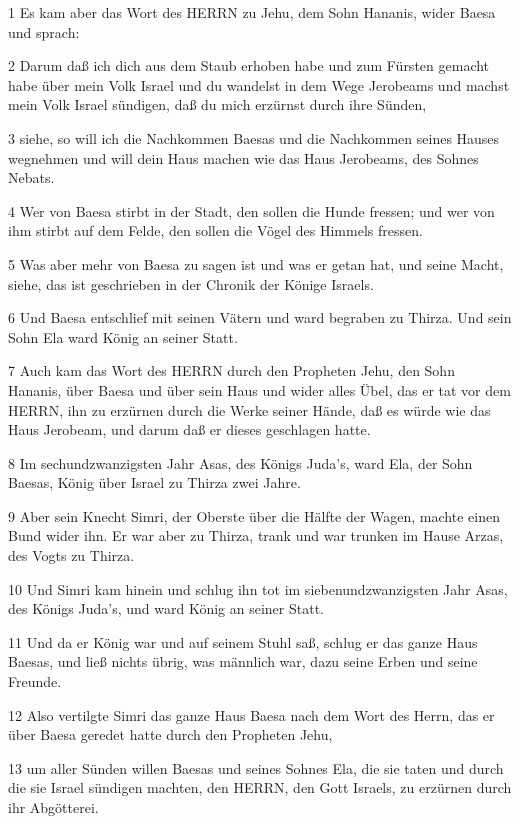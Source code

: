 \par 1 Es kam aber das Wort des HERRN zu Jehu, dem Sohn Hananis, wider Baesa und sprach:
\par 2 Darum daß ich dich aus dem Staub erhoben habe und zum Fürsten gemacht habe über mein Volk Israel und du wandelst in dem Wege Jerobeams und machst mein Volk Israel sündigen, daß du mich erzürnst durch ihre Sünden,
\par 3 siehe, so will ich die Nachkommen Baesas und die Nachkommen seines Hauses wegnehmen und will dein Haus machen wie das Haus Jerobeams, des Sohnes Nebats.
\par 4 Wer von Baesa stirbt in der Stadt, den sollen die Hunde fressen; und wer von ihm stirbt auf dem Felde, den sollen die Vögel des Himmels fressen.
\par 5 Was aber mehr von Baesa zu sagen ist und was er getan hat, und seine Macht, siehe, das ist geschrieben in der Chronik der Könige Israels.
\par 6 Und Baesa entschlief mit seinen Vätern und ward begraben zu Thirza. Und sein Sohn Ela ward König an seiner Statt.
\par 7 Auch kam das Wort des HERRN durch den Propheten Jehu, den Sohn Hananis, über Baesa und über sein Haus und wider alles Übel, das er tat vor dem HERRN, ihn zu erzürnen durch die Werke seiner Hände, daß es würde wie das Haus Jerobeam, und darum daß er dieses geschlagen hatte.
\par 8 Im sechundzwanzigsten Jahr Asas, des Königs Juda's, ward Ela, der Sohn Baesas, König über Israel zu Thirza zwei Jahre.
\par 9 Aber sein Knecht Simri, der Oberste über die Hälfte der Wagen, machte einen Bund wider ihn. Er war aber zu Thirza, trank und war trunken im Hause Arzas, des Vogts zu Thirza.
\par 10 Und Simri kam hinein und schlug ihn tot im siebenundzwanzigsten Jahr Asas, des Königs Juda's, und ward König an seiner Statt.
\par 11 Und da er König war und auf seinem Stuhl saß, schlug er das ganze Haus Baesas, und ließ nichts übrig, was männlich war, dazu seine Erben und seine Freunde.
\par 12 Also vertilgte Simri das ganze Haus Baesa nach dem Wort des Herrn, das er über Baesa geredet hatte durch den Propheten Jehu,
\par 13 um aller Sünden willen Baesas und seines Sohnes Ela, die sie taten und durch die sie Israel sündigen machten, den HERRN, den Gott Israels, zu erzürnen durch ihr Abgötterei.
